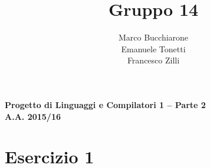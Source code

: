 \documentclass[a4paper,oneside,11pt]{article}
\makeatletter
\renewcommand\and{\\}
\renewcommand\maketitle{%
\bigskip\bigskip\bigskip\bigskip%
\begin{center}\bfseries\large%
Progetto di Linguaggi e Compilatori 1 -- Parte 2 \\ A.A. 2015/16\\%
\end{center}%
\bigskip%
\begin{center}\bfseries\LARGE \@title  \end{center}%
\bigskip%
\begin{center}\bfseries\large \@author \end{center}%
\bigskip\bigskip}
\makeatother
\begin{document}
\title{Gruppo 14}
\author{Marco Bucchiarone \and Emanuele Tonetti \and Francesco Zilli}
\maketitle
%
\section*{Esercizio 1}

\end{document}
